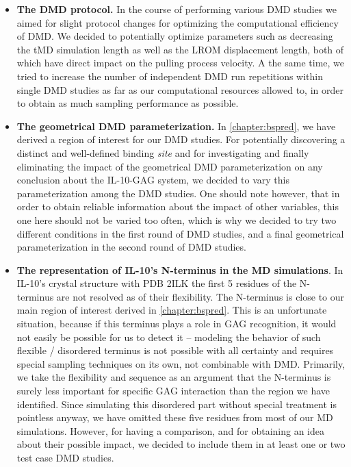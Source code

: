 \begin{itemize}

\item \textbf{The DMD protocol.} In the course of performing various DMD studies
we aimed for slight protocol changes for optimizing the computational efficiency
of DMD. We decided to potentially optimize parameters such as decreasing the tMD
simulation length as well as the LROM displacement length, both of which have
direct impact on the pulling process velocity. A the same time, we tried to
increase the number of independent DMD run repetitions within single DMD studies
as far as our computational resources allowed to, in order to obtain as much
sampling performance as possible.

\item \textbf{The geometrical DMD parameterization.} In \cref{chapter:bspred},
we have derived a region of interest for our DMD studies. For potentially
discovering a distinct and well-defined binding \textit{site} and for
investigating and finally eliminating the impact of the geometrical DMD
parameterization on any conclusion about the IL-10-GAG system, we decided to
vary this parameterization among the DMD studies. One should note however, that
in order to obtain reliable information about the impact of other variables,
this one here should not be varied too often, which is why we decided to try two
different conditions in the first round of DMD studies, and a final geometrical
parameterization in the second round of DMD studies.

\item \textbf{The representation of IL-10's N-terminus in the MD simulations}.
In IL-10's crystal structure with PDB 2ILK the first 5 residues of the
N-terminus are not resolved as of their flexibility. The N-terminus is close to
our main region of interest derived in \cref{chapter:bspred}. This is an
unfortunate situation, because if this terminus plays a role in GAG recognition,
it would not easily be possible for us to detect it -- modeling the behavior of
such flexible / disordered terminus is not possible with all certainty and
requires special sampling techniques on its own, not combinable with DMD.
Primarily, we take the flexibility and sequence as an argument that the
N-terminus is surely less important for specific GAG interaction than the region
we have identified. Since simulating this disordered part without special
treatment is pointless anyway, we have omitted these five residues from most of
our MD simulations. However, for having a comparison, and for obtaining an idea
about their possible impact, we decided to include them in at least one or two
test case DMD studies.


\end{itemize}
